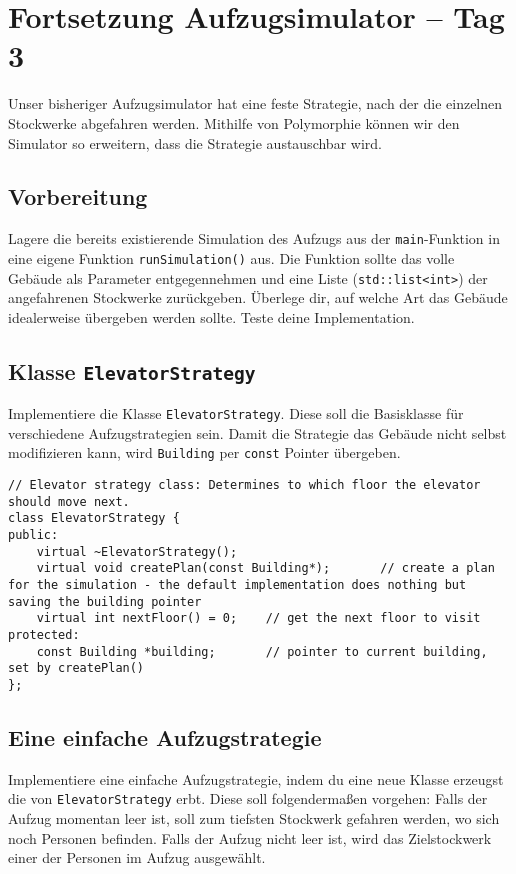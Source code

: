 \section{Fortsetzung Aufzugsimulator -- Tag 3}
Unser bisheriger Aufzugsimulator hat eine feste Strategie, nach der die einzelnen Stockwerke abgefahren werden.
Mithilfe von Polymorphie können wir den Simulator so erweitern, dass die Strategie austauschbar wird.  

\subsection{Vorbereitung}
Lagere die bereits existierende Simulation des Aufzugs aus der \lstinline{main}-Funktion in eine eigene Funktion \lstinline{runSimulation()} aus.
Die Funktion sollte das volle Gebäude als Parameter entgegennehmen und eine Liste (\lstinline{std::list<int>}) der angefahrenen Stockwerke zurückgeben.
Überlege dir, auf welche Art das Gebäude idealerweise übergeben werden sollte.
Teste deine Implementation.

\subsection{Klasse \lstinline{ElevatorStrategy}}
Implementiere die Klasse \lstinline{ElevatorStrategy}.
Diese soll die Basisklasse für verschiedene Aufzugstrategien sein.
Damit die Strategie das Gebäude nicht selbst modifizieren kann, wird \lstinline{Building} per \lstinline{const} Pointer übergeben.

\begin{lstlisting}
// Elevator strategy class: Determines to which floor the elevator should move next.
class ElevatorStrategy {
public:
	virtual ~ElevatorStrategy();
	virtual void createPlan(const Building*);		// create a plan for the simulation - the default implementation does nothing but saving the building pointer
	virtual int nextFloor() = 0;	// get the next floor to visit
protected:
	const Building *building;		// pointer to current building, set by createPlan()
};
\end{lstlisting}

\subsection{Eine einfache Aufzugstrategie}
Implementiere eine einfache Aufzugstrategie, indem du eine neue Klasse erzeugst die von \lstinline{ElevatorStrategy} erbt.
Diese soll folgendermaßen vorgehen: 
Falls der Aufzug momentan leer ist, soll zum tiefsten Stockwerk gefahren werden, wo sich noch Personen befinden.
Falls der Aufzug nicht leer ist, wird das Zielstockwerk einer der Personen im Aufzug ausgewählt.

